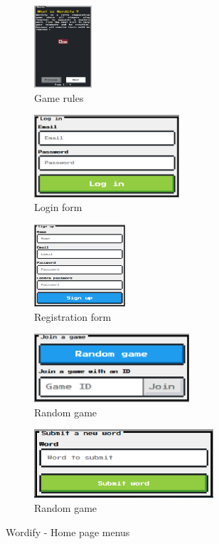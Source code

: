 \documentclass{tnreport}
\begin{document}
\vspace*{0.1cm}

\begin{figure}[ht]
	\centering
	\fboxsep=1.2pt
	\begin{subfigure}[t]{0.3\textwidth}
		\centering
		\includegraphics[height=1.2in]{figures/game_rules}
		\caption{Game rules}
		\label{fig:game_rules}
	\end{subfigure}
	\begin{subfigure}[t]{0.3\textwidth}
		\centering
		\includegraphics[height=1.2in]{figures/login_form}
		\caption{Login form}
		\label{fig:login_form}
	\end{subfigure}
	\begin{subfigure}[t]{0.3\textwidth}
		\centering
		\includegraphics[height=1.2in]{figures/registration_form}
		\caption{Registration form}
		\label{fig:registration_form}
	\end{subfigure}
	\begin{subfigure}[t]{0.48\textwidth}
		\centering
		\vspace*{0.5cm}
		\includegraphics[height=1in]{figures/random_game}
		\caption{Random game}
		\label{fig:random_game_2}
	\end{subfigure}
	\begin{subfigure}[t]{0.48\textwidth}
		\centering
		\vspace*{0.5cm}
		\includegraphics[height=1in]{figures/propose_word}
		\caption{Random game}
		\label{fig:propose_word}
	\end{subfigure}
	\caption{Wordify - Home page menus}
	\label{fig:wordify_home_page_menus}
\end{figure}
\end{document}
